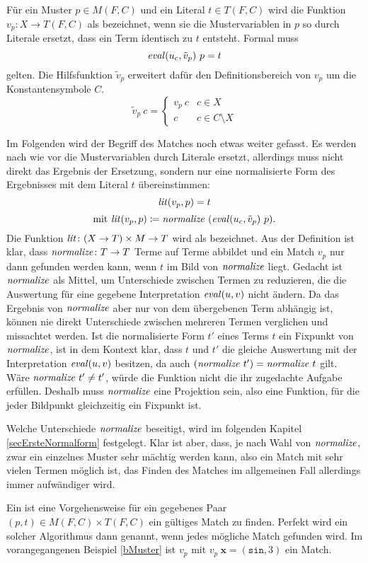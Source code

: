 \begin{definition} \label{defMatch}
Für ein Muster $p \in M(F, C)$ und ein Literal $t \in T(F, C)$ wird die Funktion $v_p \colon X \rightarrow T(F, C)$ als  bezeichnet, wenn sie die Mustervariablen in $p$ so durch Literale ersetzt, dass ein Term identisch zu $t$ entsteht. Formal muss 
$$\mathit{eval}(u_c, \tilde v_p)~ p = t$$
gelten. Die Hilfsfunktion $\tilde v_p$ erweitert dafür den Definitionsbereich von $v_p$ um die Konstantensymbole $C$.
$$\tilde v_p~ c = \begin{cases}
	v_p~ c & c \in X\\
	c      & c \in C \setminus X
\end{cases}$$

Im Folgenden wird der Begriff des Matches noch etwas weiter gefasst. Es werden nach wie vor die Mustervariablen durch Literale ersetzt, allerdings muss nicht direkt das Ergebnis der Ersetzung, sondern nur eine normalisierte Form des Ergebnisses mit dem Literal $t$ übereinstimmen:
$$\mathit{lit}(v_p, p)  = t$$
$$\text{mit~}\mathit{lit}(v_p, p) \coloneqq \mathit{normalize}~(\mathit{eval}(u_c, \tilde v_p)~ p).$$
Die Funktion $\Const{lit} \colon \paren*{X \rightarrow T} \times M \rightarrow T$ wird als  bezeichnet.
Aus der Definition ist klar, dass $\mathit{normalize} \colon T \rightarrow T$ Terme auf Terme abbildet und ein Match $v_p$ nur dann gefunden werden kann, wenn $t$ im Bild von $\mathit{normalize}$ liegt. 
Gedacht ist $\mathit{normalize}$ als Mittel, um Unterschiede zwischen Termen zu reduzieren, die die Auswertung für eine gegebene Interpretation $\mathit{eval}(u, v)$ nicht ändern. Da das Ergebnis von $\mathit{normalize}$ aber nur von dem übergebenen Term abhängig ist, können nie direkt Unterschiede zwischen mehreren Termen verglichen und missachtet werden. Ist die normalisierte Form $t'$ eines Terms $t$ ein Fixpunkt von $\mathit{normalize}$, ist in dem Kontext klar, dass $t$ und $t'$ die gleiche Auswertung mit der Interpretation $\mathit{eval}(u, v)$ besitzen, da auch $(\mathit{normalize}~t') = \mathit{normalize}~t$ gilt. Wäre $\mathit{normalize}~t' \neq t'$, würde die Funktion nicht die ihr zugedachte Aufgabe erfüllen. Deshalb muss $\mathit{normalize}$ eine Projektion sein, also eine Funktion, für die jeder Bildpunkt gleichzeitig ein Fixpunkt ist. 

Welche Unterschiede $\mathit{normalize}$ beseitigt, wird im folgenden Kapitel \ref{secErsteNormalform} festgelegt. Klar ist aber, dass, je nach Wahl von $\mathit{normalize}$, zwar ein einzelnes Muster sehr mächtig werden kann, also ein Match mit sehr vielen Termen möglich ist, das Finden des Matches im allgemeinen Fall allerdings immer aufwändiger wird. 
\end{definition}

Ein  ist eine Vorgehensweise für ein gegebenes Paar {$(p, t) \in M(F, C) \times T(F, C)$} ein gültiges Match zu finden. Perfekt wird ein solcher Algorithmus dann genannt, wenn jedes mögliche Match gefunden wird.
Im vorangegangenen Beispiel \ref{bMuster} ist $v_p$ mit $v_p~ \mathbf x = (\texttt{sin}, 3)$ ein Match.


